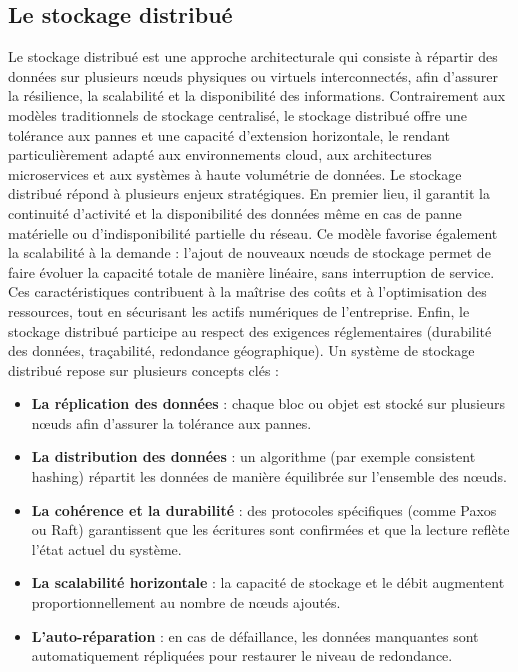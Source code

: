 \subsection{Le stockage distribué}

Le stockage distribué est une approche architecturale qui consiste à répartir des données sur plusieurs nœuds physiques ou virtuels interconnectés, afin d’assurer la résilience, la scalabilité et la disponibilité des informations. Contrairement aux modèles traditionnels de stockage centralisé, le stockage distribué offre une tolérance aux pannes et une capacité d’extension horizontale, le rendant particulièrement adapté aux environnements cloud, aux architectures microservices et aux systèmes à haute volumétrie de données.
Le stockage distribué répond à plusieurs enjeux stratégiques. En premier lieu, il garantit la continuité d’activité et la disponibilité des données même en cas de panne matérielle ou d’indisponibilité partielle du réseau. Ce modèle favorise également la scalabilité à la demande  : l’ajout de nouveaux nœuds de stockage permet de faire évoluer la capacité totale de manière linéaire, sans interruption de service. Ces caractéristiques contribuent à la maîtrise des coûts et à l’optimisation des ressources, tout en sécurisant les actifs numériques de l’entreprise. Enfin, le stockage distribué participe au respect des exigences réglementaires (durabilité des données, traçabilité, redondance géographique).
Un système de stockage distribué repose sur plusieurs concepts clés :
\begin{itemize}
	\item \textbf{La réplication des données}  : chaque bloc ou objet est stocké sur plusieurs nœuds afin d’assurer la tolérance aux pannes.
	\item \textbf{La distribution des données}  : un algorithme (par exemple consistent hashing) répartit les données de manière équilibrée sur l’ensemble des nœuds.
	\item \textbf{La cohérence et la durabilité}  : des protocoles spécifiques (comme Paxos ou Raft) garantissent que les écritures sont confirmées et que la lecture reflète l’état actuel du système.
	\item \textbf{La scalabilité horizontale}  : la capacité de stockage et le débit augmentent proportionnellement au nombre de nœuds ajoutés.
	\item \textbf{L’auto-réparation}  : en cas de défaillance, les données manquantes sont automatiquement répliquées pour restaurer le niveau de redondance.
\end{itemize}

